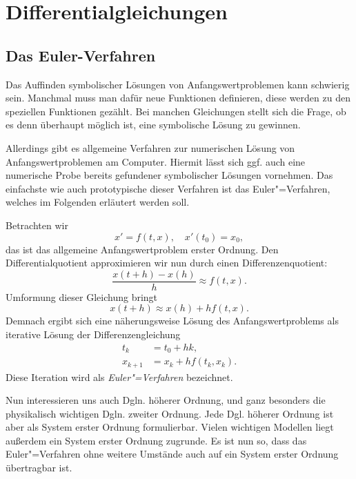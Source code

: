 
\chapter{Differentialgleichungen}

\section{Das Euler-Verfahren}

Das Auffinden symbolischer Lösungen von Anfangswertproblemen kann
schwierig sein. Manchmal muss man dafür neue Funktionen definieren,
diese werden zu den speziellen Funktionen gezählt. Bei manchen
Gleichungen stellt sich die Frage, ob es denn überhaupt möglich ist,
eine symbolische Lösung zu gewinnen.

Allerdings gibt es allgemeine Verfahren zur numerischen Lösung von
Anfangswertproblemen am Computer. Hiermit lässt sich ggf. auch eine
numerische Probe bereits gefundener symbolischer Lösungen vornehmen.
Das einfachste wie auch prototypische dieser Verfahren ist das
Euler"=Verfahren, welches im Folgenden erläutert werden soll.

Betrachten wir
\begin{equation}\label{eq:AWP-O1}
x' = f(t,x),\quad x'(t_0) = x_0,
\end{equation}
das ist das allgemeine Anfangswertproblem erster Ordnung. Den
Differentialquotient approximieren wir nun durch einen
Differenzenquotient:%
\begin{equation}
\frac{x(t+h)-x(h)}{h} \approx f(t,x).
\end{equation}
Umformung dieser Gleichung bringt
\begin{equation}
x(t+h)\approx x(h)+hf(t,x).
\end{equation}
Demnach ergibt sich eine näherungsweise Lösung des Anfangswertproblems
als iterative Lösung der Differenzengleichung%
\begin{align}
t_{k} &= t_0+hk,\\
x_{k+1} &= x_k+hf(t_k,x_k).
\end{align}
Diese Iteration wird als \emph{Euler"=Verfahren} bezeichnet.

Nun interessieren uns auch Dgln. höherer Ordnung, und ganz besonders
die physikalisch wichtigen Dgln. zweiter Ordnung. Jede Dgl. höherer
Ordnung ist aber als System erster Ordnung formulierbar. Vielen
wichtigen Modellen liegt außerdem ein System erster Ordnung zugrunde.
Es ist nun so, dass das Euler"=Verfahren ohne weitere Umstände auch
auf ein System erster Ordnung übertragbar ist.

